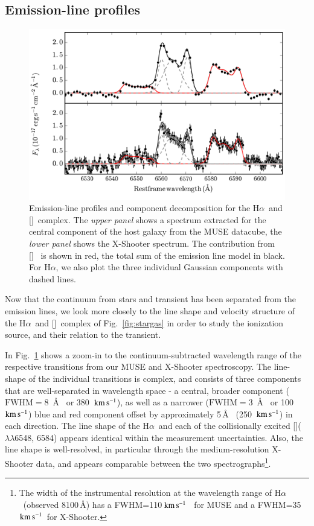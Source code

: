 \documentclass[traditabstract]{aa}
\newcommand{\kms}{$\rm{km\,s^{-1}}$}
\newcommand{\ha}{H$\alpha$}
\newcommand{\nii}{[\ion{N}{ii}]}
\begin{document}

\subsection{Emission-line profiles}
\label{sec:prof}

\begin{figure}
  \includegraphics[width=0.999\linewidth]{fig/MUSE_XS_lineshape.pdf}
\caption{Emission-line profiles and component decomposition for the \ha\, and \nii\, complex. The \textit{upper panel} shows a spectrum extracted for the central component of the host galaxy from the MUSE datacube, the \textit{lower panel} shows the X-Shooter spectrum. The contribution from \nii~ is shown in red, the total sum of the emission line model in black. For \ha, we also plot the three individual Gaussian components with dashed lines.}
\label{fig:hanii}
\end{figure}

Now that the continuum from stars and transient has been separated from the emission lines, we look more closely to the line shape and velocity structure of the \ha\, and \nii\, complex of Fig.~\ref{fig:stargas} in order to study the ionization source, and their relation to the transient.

In Fig.~\ref{fig:hanii} shows a zoom-in to the continuum-subtracted wavelength range of the respective transitions from our MUSE and X-Shooter spectroscopy. The line-shape of the individual transitions is complex, and consists of three components that are well-separated in wavelength space - a central, broader component ($\mathrm{FWHM}=8$~\AA~ or 380~\kms), as well as a narrower ($\mathrm{FWHM}=3$~\AA~ or 100\,\kms) blue and red component offset by approximately 5\,\AA~ (250~\kms) in each direction. The line shape of the \ha\, and each of the collisionally excited \nii($\lambda\lambda$6548, 6584) appears identical within the measurement uncertainties. Also, the line shape is well-resolved, in particular through the medium-resolution X-Shooter data, and appears comparable between the two spectrographs\footnote{The width of the instrumental resolution at the wavelength range of \ha~(observed 8100\,\AA) has a FWHM=110\,\kms~ for MUSE and a FWHM=35\,\kms~for X-Shooter.}.
\end{document}
